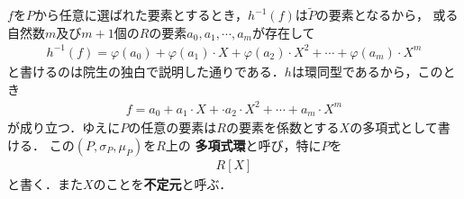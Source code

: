	$f$を$P$から任意に選ばれた要素とするとき，$h^{-1}(f)$は$\tilde{P}$の要素となるから，
	或る自然数$m$及び$m+1$個の$R$の要素$a_0,a_1,\cdots,a_m$が存在して
	\begin{align}
		h^{-1}(f) = \varphi(a_0) + \varphi(a_1) \cdot X + \varphi(a_2) \cdot X^2 + \cdots + \varphi(a_m) \cdot X^m
	\end{align}
	と書けるのは院生の独白で説明した通りである．$h$は環同型であるから，このとき
	\begin{align}
		f = a_0 + a_1 \cdot X + \cdot a_2 \cdot X^2 + \cdots + a_m \cdot X^m
	\end{align}
	が成り立つ．ゆえに$P$の任意の要素は$R$の要素を係数とする$X$の多項式として書ける．
	この$(P,\sigma_P,\mu_P)$を$R$上の
	{\bf 多項式環}と呼び，特に$P$を
	\begin{align}
		R[X]
	\end{align}
	と書く．また$X$のことを{\bf 不定元}と呼ぶ．
	
	
	\begin{screen}
		\begin{thm}[整域上の多項式環は整域]
			
		\end{thm}
	\end{screen}
	
	\begin{screen}
		\begin{thm}[体の上の多項式環はEuclid整域]
		\end{thm}
	\end{screen}
	
	\begin{screen}
		\begin{thm}[Euclid整域は単項イデアル整域]
		\end{thm}
	\end{screen}